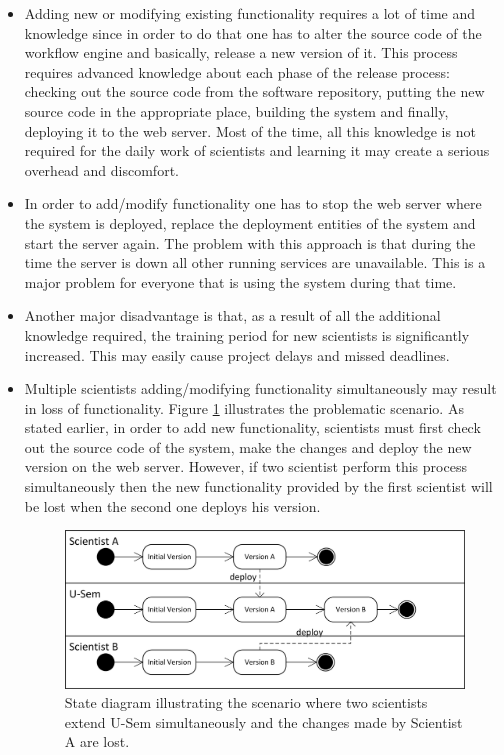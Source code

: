 \begin{itemize}

	\item Adding new or modifying existing functionality requires a lot of time and knowledge since in order to do that one has to alter the source code of the workflow engine and basically, release a new version of it. This process requires advanced knowledge about each phase of the release process: checking out the source code from the software repository, putting the new source code in the appropriate place, building the system and finally, deploying it to the web server. Most of the time, all this knowledge is not required for the daily work of scientists and learning it may create a serious overhead and discomfort.
	
	\item In order to add/modify functionality one has to stop the web server where the system is deployed, replace the deployment entities of the system and start the server again. The problem with this approach is that during the time the server is down all other running services are unavailable. This is a major problem for everyone that is using the system during that time.
	
	\item Another major disadvantage is that, as a result of all the additional knowledge required, the training period for new scientists is significantly increased. This may easily cause project delays and missed deadlines.
	
	\item Multiple scientists adding/modifying functionality simultaneously may result in loss of functionality. Figure \ref{fig_vers_prob} illustrates the problematic scenario. As stated earlier, in order to add new functionality, scientists must first check out the source code of the system, make the changes and deploy the new version on the web server. However, if two scientist perform this process simultaneously then the new functionality provided by the first scientist will be lost when the second one deploys his version. 
	
	\begin{figure}[h!]
  \centering
  	\includegraphics[scale=0.75]{plug-in/version_problem.png}
  \caption{State diagram illustrating the scenario where two scientists extend U-Sem simultaneously and the changes made by Scientist A are lost.  }
  \label{fig_vers_prob}
\end{figure}
	

\end{itemize}
